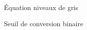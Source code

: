 \begin{frame}
\begin{columns}
\begin{column}{.3\linewidth}
                \end{column}
                \begin{column}{.3\linewidth}
                \end{column}
            \end{columns}
            \pause
            \begin{exampleblock}{Équation niveaux de gris}
            \end{exampleblock}
            \begin{exampleblock}{Seuil de conversion binaire}
            \end{exampleblock}
        \end{frame}

